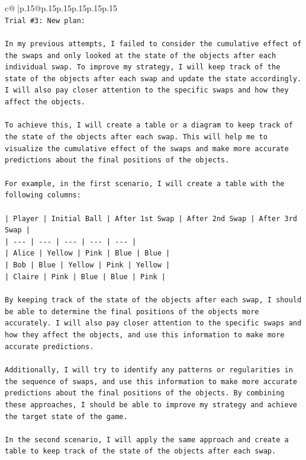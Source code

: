 \documentclass{article}
\begin{document}
{\begin{supertabular}{c@{$\;$}|p{.15\linewidth}@{}p{.15\linewidth}p{.15\linewidth}p{.15\linewidth}p{.15\linewidth}p{.15\linewidth}}
{{{\\ 
\texttt{Trial \#3: New plan: } \\
\\ 
\texttt{In my previous attempts, I failed to consider the cumulative effect of the swaps and only looked at the state of the objects after each individual swap. To improve my strategy, I will keep track of the state of the objects after each swap and update the state accordingly. I will also pay closer attention to the specific swaps and how they affect the objects.} \\
\\ 
\texttt{To achieve this, I will create a table or a diagram to keep track of the state of the objects after each swap. This will help me to visualize the cumulative effect of the swaps and make more accurate predictions about the final positions of the objects.} \\
\\ 
\texttt{For example, in the first scenario, I will create a table with the following columns:} \\
\\ 
\texttt{| Player | Initial Ball | After 1st Swap | After 2nd Swap | After 3rd Swap |} \\
\texttt{| {-}{-}{-} | {-}{-}{-} | {-}{-}{-} | {-}{-}{-} | {-}{-}{-} |} \\
\texttt{| Alice | Yellow | Pink | Blue | Blue |} \\
\texttt{| Bob | Blue | Yellow | Pink | Yellow |} \\
\texttt{| Claire | Pink | Blue | Blue | Pink |} \\
\\ 
\texttt{By keeping track of the state of the objects after each swap, I should be able to determine the final positions of the objects more accurately. I will also pay closer attention to the specific swaps and how they affect the objects, and use this information to make more accurate predictions.} \\
\\ 
\texttt{Additionally, I will try to identify any patterns or regularities in the sequence of swaps, and use this information to make more accurate predictions about the final positions of the objects. By combining these approaches, I should be able to improve my strategy and achieve the target state of the game.} \\
\\ 
\texttt{In the second scenario, I will apply the same approach and create a table to keep track of the state of the objects after each swap.} \\
}}}
\end{supertabular}}
\end{document}
